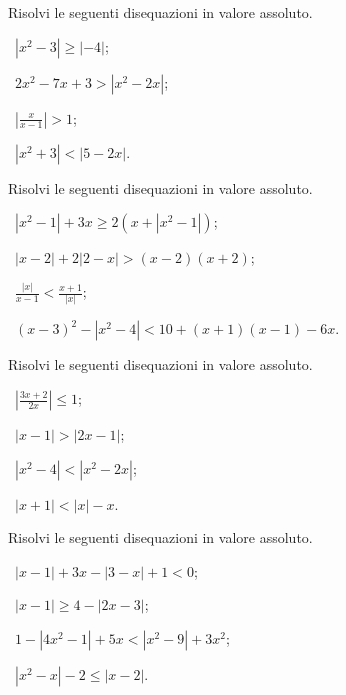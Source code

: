 \begin{esercizio}[\Ast]
 \label{ese:7.32}
Risolvi le seguenti disequazioni in valore assoluto.
\begin{multicols}{2}
 \begin{enumeratea}
 \item~$\left|x^2-3\right|\ge \left|-4\right|$;
 \item~$2x^2-7x+3>\left|x^2-2x\right|$;
 \item~$\left|\frac x{x-1}\right|>1$;
 \item~$\left|x^2+3\right|<\left|5-2x\right|$.
 \end{enumeratea}
 \end{multicols}
\end{esercizio}

\begin{esercizio}[\Ast]
 \label{ese:7.33}
Risolvi le seguenti disequazioni in valore assoluto.
\begin{multicols}{2}
 \begin{enumeratea}
 \item~$\left|x^2-1\right|+3x\ge 2\left(x+\left|x^2-1\right|\right)$;
 \item~$\left|x-2\right|+2\left|2-x\right|>(x-2)(x+2)$;
 \item~$\frac{\left|x\right|}{x-1}<\frac{x+1}{\left|x\right|}$;
 \item~$(x-3)^2-\left|x^2-4\right|<10+(x+1)(x-1)-6x$.
 \end{enumeratea}
 \end{multicols}
\end{esercizio}
\pagebreak
\begin{esercizio}[\Ast]
 \label{ese:7.34}
Risolvi le seguenti disequazioni in valore assoluto.
\begin{multicols}{2}
 \begin{enumeratea}
 \item~$\left|\frac{3x+2}{2x}\right|\le 1$;
 \item~$\left|x-1\right|>\left|2x-1\right|$;
 \item~$\left|x^2-4\right|<\left|x^2-2x\right|$;
 \item~$\left|x+1\right|<\left|x\right|-x$.
 \end{enumeratea}
 \end{multicols}
\end{esercizio}

\begin{esercizio}[\Ast]
 \label{ese:7.35}
Risolvi le seguenti disequazioni in valore assoluto.
\begin{multicols}{2}
 \begin{enumeratea}
 \item~$\left|x-1\right|+3x-\left|3-x\right|+1<0$;
 \item~$\left|x-1\right|\ge 4-\left|2x-3\right|$;
 \item~$1-\left|4x^2-1\right|+5x<\left|x^2-9\right|+3x^2$;
 \item~$\left|x^2-x\right|-2\le \left|x-2\right|$.
 \end{enumeratea}
 \end{multicols}
\end{esercizio}

